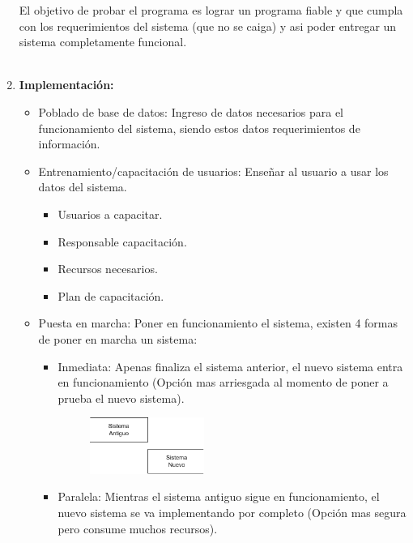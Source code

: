 \documentclass{templateNote}
\begin{document}
\begin{enumerate}
        El objetivo de probar el programa es lograr un programa fiable y que cumpla con los requerimientos del sistema (que no se caiga) y asi poder entregar un sistema completamente funcional. \\\\
    \item \hypertarget{imp}{\textbf{Implementación:}}
        \begin{itemize}
            \item Poblado de base de datos: Ingreso de datos necesarios para el funcionamiento del sistema, siendo estos datos requerimientos de información.
            \item Entrenamiento/capacitación de usuarios: Enseñar al usuario a usar los datos del sistema.
            \begin{itemize}
                \item Usuarios a capacitar.
                \item Responsable capacitación.
                \item Recursos necesarios.
                \item Plan de capacitación. 
            \end{itemize}
            \item Puesta en marcha: Poner en funcionamiento el sistema, existen 4 formas de poner en marcha un sistema:            
            \begin{itemize}
                \item Inmediata: Apenas finaliza el sistema anterior, el nuevo sistema entra en funcionamiento (Opción mas arriesgada al momento de poner a prueba el nuevo sistema).
                \begin{figure}[H]
                    \centering
                    \includegraphics[width=0.4\textwidth]{img/Inmediato.png}
                \end{figure}
                \item Paralela: Mientras el sistema antiguo sigue en funcionamiento, el nuevo sistema se va implementando por completo (Opción mas segura pero consume muchos recursos).
                \begin{figure}[H]
                    \centering

\end{figure}
\end{itemize}
\end{itemize}
\end{enumerate}
\end{document}
